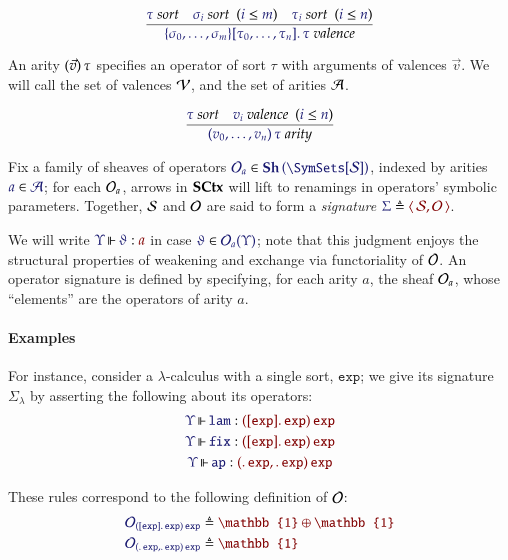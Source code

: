 \documentclass[11pt]{article}
\theoremstyle{definition}
\theoremstyle{remark}
\numberwithin{equation}{section}
\newcommand\SortExp{\mathtt{exp}}
\newcommand\Sheaves[1]{\mathbf{Sh}\left(#1\right)}
\newcommand\SCtxSite{\SymSets[\Sorts]}
\begin{document}
\[
  \infer{
    \IsValence{
      \MkValence
        {\sigma_0,\dots,\sigma_m}
        {\tau_0,\dots,\tau_n}
        {\tau}
    }
  }{
    \IsSort{\tau}
&
    \HypJ{\IsSort{\sigma_i}}{\Leq{i}{m}}
&
    \HypJ{\IsSort{\tau_i}}{\Leq{i}{n}}
  }
\]

An arity $(\vec{v})\, \tau$ specifies an operator of sort $\tau$ with
arguments of valences $\vec{v}$. We will call the set of valences $\mathcal{V}$,
and the set of arities $\mathcal{A}$.

\[
  \infer{
    \IsArity{
      \MkArity
        {v_0,\ldots,v_n}
        {\tau}
    }
  }{
    \IsSort{\tau}
&
    \HypJ
      {\IsValence{v_i}}
      {\Leq{i}{n}}
  }
\]


Fix a family of sheaves of operators
$\Member{\Operators_a}{\Sheaves{\SCtxSite}}$, indexed by arities
$\Member{a}{\Arities}$; for each $\mathcal{O}_a$, arrows in $\mathbf{SCtx}$ will lift to
renamings in operators' symbolic parameters. Together, $\mathcal{S}$ and $\mathcal{O}$ are said to form a \emph{signature}
$\Define{\Sigma}{\Pair{\Sorts}{\Operators}}$.

We will write $\IsOperator{\Upsilon}{\vartheta}{a}$ in case
$\Member{\vartheta}{\Operators_a(\Upsilon)}$; note that this judgment enjoys
the structural properties of weakening and exchange via functoriality of
$\mathcal{O}$. An operator signature is defined by specifying, for each arity
$a$, the sheaf $\mathcal{O}_a$, whose ``elements'' are the operators of arity
$a$.


\paragraph{Examples}

For instance, consider a $\lambda$-calculus with a single sort, $\SortExp$; we
give its signature $\Sigma_{\lambda}$ by asserting the following about its
operators:
\begin{gather*}
  \IsOperator{\Upsilon}{\mathtt{lam}}{
    \MkArity{
      \MkValence{}{\SortExp}{\SortExp}
    }{\SortExp}
  }\\
  \IsOperator{\Upsilon}{\mathtt{fix}}{
    \MkArity{
      \MkValence{}{\SortExp}{\SortExp}
    }{\SortExp}
  }\\
  \IsOperator{\Upsilon}{\mathtt{ap}}{
    \MkArity{
      \MkValence{}{}{\SortExp},
      \MkValence{}{}{\SortExp}
    }{\SortExp}
  }
\end{gather*}

These rules correspond to the following definition of $\mathcal{O}$:
\begin{align*}
  \ADefine{
    \Operators_{
       \MkArity{
        \MkValence{}{\SortExp}{\SortExp}
      }{\SortExp}
    }
  }{
    \mathbb{1}\oplus\mathbb{1}
  }
  \\
  \ADefine{
    \Operators_{
      \MkArity{
        \MkValence{}{}{\SortExp},
        \MkValence{}{}{\SortExp}
      }{\SortExp}
    }
  }{
    \mathbb{1}
  }
\end{align*}
\end{document}
